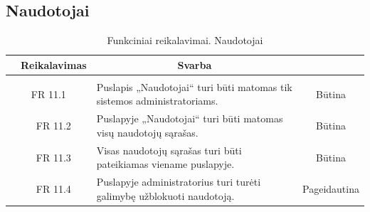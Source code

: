 \documentclass{VUMIFPSkursinis}
\begin{document}
	\subsection{Naudotojai}
	\begin{table}[H]
		\caption{Funkciniai reikalavimai. Naudotojai}
		\begin{tabular}{|p{1cm}|p{1cm}|p{}|p{}|}
			\hline
			\rowcolor{gray!50}
			\multicolumn{2}{|c|}{{\bfseries Kodas}}&
			\multicolumn{1}{c|}{{\bfseries Reikalavimas}}&
			\multicolumn{1}{c|}{{\bfseries Svarba}}\\
			\hline
			\rowcolor{lightgray}
			\multicolumn{4}{|c|}{Naudotojai}\\
			\hline
			\multicolumn{2}{|c|}{FR 11.1}&
			{Puslapis „Naudotojai“ turi būti matomas tik sistemos administratoriams.
			}&
			\multicolumn{1}{c|}{Būtina}\\
			\hline
			\multicolumn{1}{|c}{}&
			\multicolumn{1}{c|}{FR 11.2}&
			{Puslapyje „Naudotojai“ turi būti matomas visų naudotojų sąrašas.
			}&
			\multicolumn{1}{c|}{Būtina}\\
			\hline
			\multicolumn{1}{|c}{}&
			\multicolumn{1}{c|}{FR 11.3}&
			{Visas naudotojų sąrašas turi būti pateikiamas viename puslapyje.
			}&
			\multicolumn{1}{c|}{Būtina}\\
			\hline
			\multicolumn{1}{|c}{}&
			\multicolumn{1}{c|}{FR 11.4}&
			{Puslapyje administratorius turi turėti galimybę užblokuoti naudotoją.
			}&
			\multicolumn{1}{c|}{Pageidautina}\\
			\hline
		\end{tabular}
	\end{table}
\end{document}
